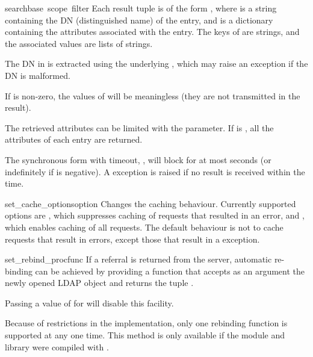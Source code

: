 \begin{methoddesc}[int]{search}{base\, scope\, filter}
Each result tuple is of the form , 
where  is a string containing
the DN (distinguished name) of the entry, and 
 is a dictionary
containing the attributes associated with the entry. 
The keys of  are strings, 
and the associated values are lists of strings.

The DN in  is extracted using the underlying ,
which may raise an exception if the DN is malformed.

If  is non-zero, the values of  will be meaningless
(they are not transmitted in the result).

The retrieved attributes can be limited with the  parameter.
If  is , all the attributes of each entry are returned.

The synchronous form with timeout, , will block for at most
 seconds (or indefinitely if  is negative). A
 exception is raised if no result is received within the
time.
\end{methoddesc}


\begin{methoddesc}{set_cache_options}{option}
Changes the caching behaviour. Currently supported options are
    , which suppresses caching of requests
    	that resulted in an error, and
    , which enables caching of all requests.
The default behaviour is not to cache requests that result in errors, except 
those that result in a  exception.
\end{methoddesc}


\begin{methoddesc}{set_rebind_proc}{func}
If a referral is returned from the server, automatic
re-binding can be achieved by providing a function that accepts as an argument
the newly opened LDAP object and returns the tuple .

Passing a value of  for  will disable
this facility. 

Because of restrictions in the implementation, only one
rebinding function is supported at any one time. This method is only
available if the module and library were compiled with .
\end{methoddesc}

